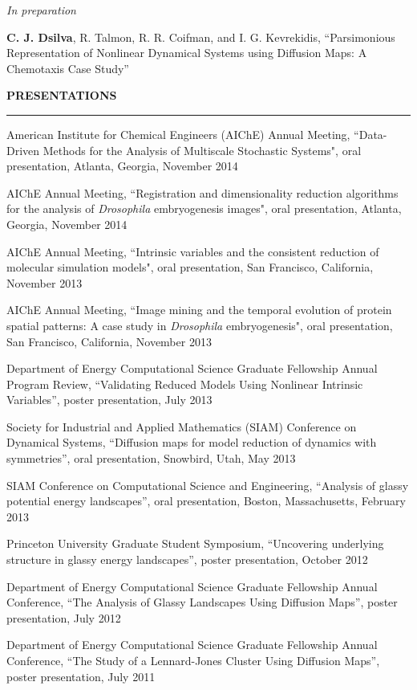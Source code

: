 \documentclass[letterpaper,10pt]{article}
\newenvironment{itemize*}
  {\begin{itemize}
    \setlength{\parskip}{-2pt}}
  {\end{itemize}}
\newcommand{\cvheading}[1]{
\vspace{0.11in}
\noindent
\MakeUppercase{\bf #1}
\vspace{0.06in}
{\hrule height 0.3mm}
\vspace{0.06in}}
\begin{document}
{\em In preparation}

\begin{itemize*}
\item {\bf C. J. Dsilva}, R. Talmon, R. R. Coifman, and I. G. Kevrekidis, ``Parsimonious Representation of Nonlinear Dynamical Systems using Diffusion Maps: A Chemotaxis Case Study''
\end{itemize*}

\cvheading{Presentations}
\begin{itemize*}
\item American Institute for Chemical Engineers (AIChE) Annual Meeting,  ``Data-Driven Methods for the Analysis of Multiscale Stochastic Systems", oral presentation, Atlanta, Georgia, November 2014
\item AIChE Annual Meeting,  ``Registration and dimensionality reduction algorithms for the analysis of {\em Drosophila} embryogenesis images", oral presentation, Atlanta, Georgia, November 2014
\item AIChE Annual Meeting,  ``Intrinsic variables and the consistent reduction of molecular simulation models", oral presentation, San Francisco, California, November 2013
\item AIChE Annual Meeting,  ``Image mining and the temporal evolution of protein spatial patterns: A case study in {\it Drosophila} embryogenesis", oral presentation, San Francisco, California, November 2013
\item Department of Energy Computational Science Graduate Fellowship Annual Program Review, ``Validating Reduced Models Using Nonlinear Intrinsic Variables'', poster presentation, July 2013
\item Society for Industrial and Applied Mathematics (SIAM) Conference on Dynamical Systems, ``Diffusion maps for model reduction of dynamics with symmetries'', oral presentation, Snowbird, Utah, May 2013
\item SIAM Conference on Computational Science and Engineering, ``Analysis of glassy potential energy landscapes'', oral presentation, Boston, Massachusetts, February 2013
\item Princeton University Graduate Student Symposium, ``Uncovering underlying structure in glassy energy landscapes'', poster presentation, October 2012
\item Department of Energy Computational Science Graduate Fellowship Annual Conference, ``The Analysis of Glassy Landscapes Using Diffusion Maps'', poster presentation, July 2012
\item Department of Energy Computational Science Graduate Fellowship Annual Conference, ``The Study of a Lennard-Jones Cluster Using Diffusion Maps'', poster presentation, July 2011
\end{itemize*}
\end{document}
